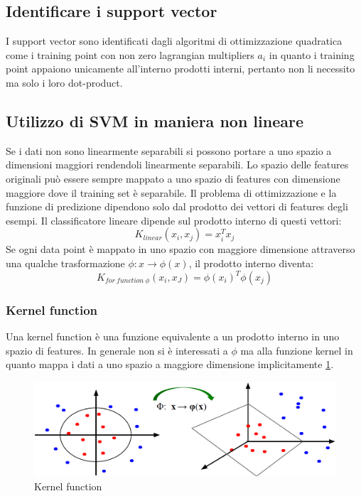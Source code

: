 	\subsection{Identificare i support vector}
	I support vector sono identificati dagli algoritmi di ottimizzazione quadratica come i training point con non zero lagrangian multipliers $a_i$ in quanto i training point appaiono unicamente all'interno prodotti interni, pertanto non li necessito ma solo i loro dot-product.

	\subsection{Utilizzo di SVM in maniera non lineare}
	Se i dati non sono linearmente separabili si possono portare a uno spazio a dimensioni maggiori rendendoli linearmente separabili.
	Lo spazio delle features originali pu\`o essere sempre mappato a uno spazio di features con dimensione maggiore dove il training set \`e separabile.
	Il problema di ottimizzazione e la funzione di predizione dipendono solo dal prodotto dei vettori di features degli esempi.
	Il classificatore lineare dipende sul prodotto interno di questi vettori:
	$$K_{linear}(x_i,x_j) = x_i^Tx_j$$
	Se ogni data point \`e mappato in uno spazio con maggiore dimensione attraverso una qualche trasformazione $\phi:x\rightarrow\phi(x)$, il prodotto interno diventa:
	$$K_{for\ function\ \phi}(x_i,x_J)= \phi(x_i)^T\phi(x_j)$$

		\subsubsection{Kernel function}
		Una kernel function \`e una funzione equivalente a un prodotto interno in uno spazio di features.
		In generale non si \`e interessati a $\phi$ ma alla funzione kernel in quanto mappa i dati a uno spazio a maggiore dimensione implicitamente \ref{fig:chapter10-02}.
		
		\begin{figure}
			\centering
			\includegraphics[width=0.6\linewidth]{imgs/chapter10/img2}
			\caption{Kernel function}
			\label{fig:chapter10-02}
		\end{figure}
	
